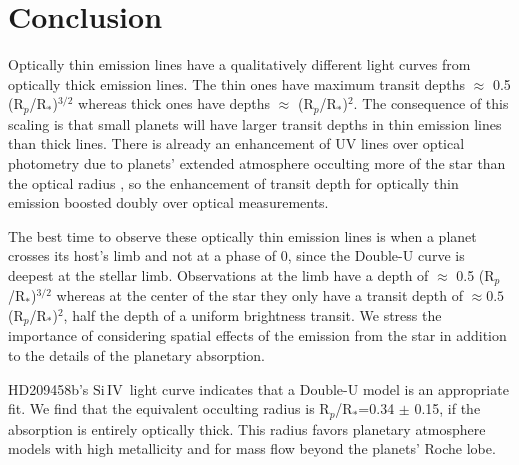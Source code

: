 \documentclass[manuscript]{aastex}
\newcommand{\siIV}{\ensuremath{\mathrm{Si}\,\scriptstyle \mathrm{IV}}}
\newcommand{\p}{R$_p$/R$_*$}
\begin{document}
\section{Conclusion}

Optically thin emission lines have a qualitatively different light curves from optically thick emission lines. The thin ones have maximum transit depths $\approx$ 0.5 (\p )$^{3/2}$ whereas thick ones have depths $\approx$ (\p )$^2$. The consequence of this scaling is that small planets will have larger transit depths in thin emission lines than thick lines. There is already an enhancement of UV lines over optical photometry due  to planets' extended atmosphere occulting more of the star than the optical radius \citep{kosk}, so the enhancement of transit depth for optically thin emission boosted doubly over optical measurements.

The best time to observe these optically thin emission lines is when a planet crosses its host's limb and not at a phase of 0, since the Double-U curve is deepest at the stellar limb. Observations at the limb have a depth of $\approx$ 0.5 (\p )$^{3/2}$ whereas at the center of the star they only have a transit depth of  $\approx 0.5 $(\p)$^2$, half the depth of a uniform brightness transit. We stress the importance of considering spatial effects of the emission from the star in addition to the details of the planetary absorption.

HD209458b's \siIV\ light curve indicates that a Double-U model is an appropriate fit. We find that the equivalent occulting radius is \p=0.34 $\pm$ 0.15, if the absorption is entirely optically thick. This radius favors planetary atmosphere models with high metallicity and for mass flow beyond the planets' Roche lobe.
\\

  
\end{document}
